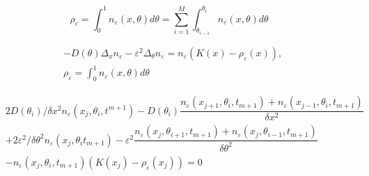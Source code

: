 \documentclass[preprint]{elsarticle}
\numberwithin{equation}{section}
\begin{document}
$$\rho_\varepsilon = \int_0^1n_\varepsilon(x,\theta) d\theta = \sum_{i=1}^M\int_{\theta_{i-1}}^{\theta_i} n_\varepsilon(x,\theta) d\theta$$

\newpage
\begin{equation}
\begin{aligned}
&-D(\theta)\Delta_x n_\varepsilon -\varepsilon^2\Delta_\theta n_\varepsilon = n_\varepsilon(K(x)-\rho_\varepsilon(x)),\\
&\rho_\varepsilon = \int_0^1n_\varepsilon(x,\theta) d\theta
\end{aligned}
\end{equation}

\begin{equation}
\begin{aligned}
&2D(\theta_i)/\delta x^2n_\varepsilon(x_j, \theta_i, t^{m+1}) - D(\theta_i)\dfrac{n_\varepsilon(x_{j+1}, \theta_i, t_{m+1})  + n_\varepsilon(x_{j-1}, \theta_i, t_{m+1})}{\delta x^2}\\
& + 2\varepsilon^2 /\delta \theta^2 n_\varepsilon(x_j,\theta_i t_{m+1})
-\varepsilon^2 \dfrac{n_\varepsilon(x_j, \theta_{i+1}, t_{m+1}) + n_\varepsilon(x_j, \theta_{i-1}, t_{m+1})}{\delta\theta^2} \\
& -n_\varepsilon(x_j, \theta_i, t_{m+1}) \left(K(x_j) - \rho_\varepsilon(x_j)\right) = 0
\end{aligned}
\end{equation}



\end{document}
